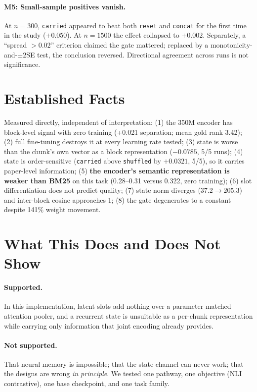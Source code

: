 \documentclass[10pt,twocolumn,letterpaper]{article}
\newcommand{\carried}{\texttt{carried}}
\newcommand{\reset}{\texttt{reset}}
\newcommand{\shuffled}{\texttt{shuffled}}
\newcommand{\concat}{\texttt{concat}}
\begin{document}
\paragraph{M5: Small-sample positives vanish.} At $n{=}300$, \carried{}
appeared to beat both \reset{} and \concat{} for the first time in the study
($+0.050$). At $n{=}1500$ the effect collapsed to $+0.002$. Separately, a
``spread $>0.02$'' criterion claimed the gate mattered; replaced by a
monotonicity-and-$\pm2$SE test, the conclusion reversed. Directional agreement
across runs is not significance.

\section{Established Facts}

Measured directly, independent of interpretation: (1) the 350M encoder has
block-level signal with zero training (+0.021 separation; mean gold rank 3.42);
(2) full fine-tuning destroys it at every learning rate tested; (3) state is
worse than the chunk's own vector as a block representation
($-0.0785$, 5/5 runs); (4) state is order-sensitive (\carried{} above
\shuffled{} by $+0.0321$, 5/5), so it carries paper-level information;
(5) \textbf{the encoder's semantic representation is weaker than BM25} on this
task (0.28--0.31 versus 0.322, zero training); (6) slot differentiation does
not predict quality; (7) state norm diverges ($37.2\to205.3$) and inter-block
cosine approaches 1; (8) the gate degenerates to a constant despite 141\%
weight movement.

\section{What This Does and Does Not Show}

\paragraph{Supported.} In this implementation, latent slots add nothing over a
parameter-matched attention pooler, and a recurrent state is unsuitable as a
per-chunk representation while carrying only information that joint encoding
already provides.

\paragraph{Not supported.} That neural memory is impossible; that the state
channel can never work; that the designs are wrong \emph{in principle}. We
tested one pathway, one objective (NLI contrastive), one base checkpoint, and
one task family.
\end{document}
